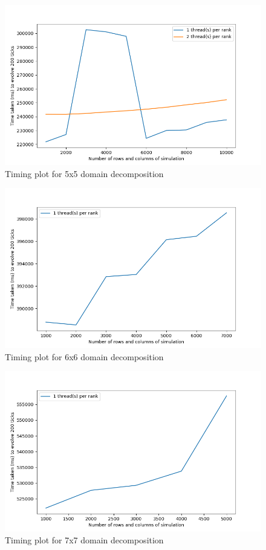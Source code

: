 \documentclass[12pt]{article}
\begin{document}
\begin{figure}[hp]
    \includegraphics[scale=0.65, center]{figures/time_hybrid_r25_plot.png}
    \caption{Timing plot for 5x5 domain decomposition}
    \label{fig:time_r25}
\end{figure}

\begin{figure}[hp]
    \includegraphics[scale=0.65, center]{figures/time_hybrid_r36_plot.png}
    \caption{Timing plot for 6x6 domain decomposition}
    \label{fig:time_r36}
\end{figure}

\begin{figure}[hp]
    \includegraphics[scale=0.65, center]{figures/time_hybrid_r49_plot.png}
    \caption{Timing plot for 7x7 domain decomposition}
    \label{fig:time_r49}
\end{figure}
\end{document}
